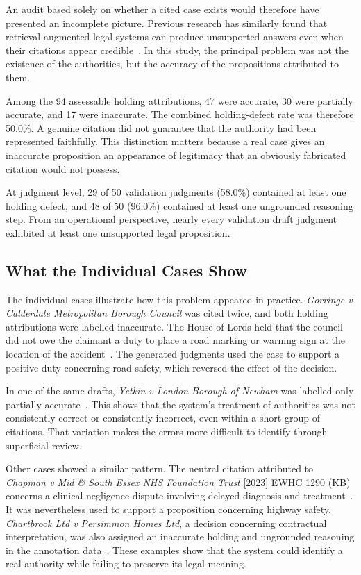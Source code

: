 \documentclass[conference]{IEEEtran}
\begin{document}
An audit based solely on whether a cited case exists would therefore have presented an incomplete picture. Previous research has similarly found that retrieval-augmented legal systems can produce unsupported answers even when their citations appear credible~\cite{magesh2024}. In this study, the principal problem was not the existence of the authorities, but the accuracy of the propositions attributed to them.

Among the 94 assessable holding attributions, 47 were accurate, 30 were partially accurate, and 17 were inaccurate. The combined holding-defect rate was therefore 50.0\%. A genuine citation did not guarantee that the authority had been represented faithfully. This distinction matters because a real case gives an inaccurate proposition an appearance of legitimacy that an obviously fabricated citation would not possess.

At judgment level, 29 of 50 validation judgments (58.0\%) contained at least one holding defect, and 48 of 50 (96.0\%) contained at least one ungrounded reasoning step. From an operational perspective, nearly every validation draft judgment exhibited at least one unsupported legal proposition.

\subsection{What the Individual Cases Show}

The individual cases illustrate how this problem appeared in practice. \textit{Gorringe v Calderdale Metropolitan Borough Council} was cited twice, and both holding attributions were labelled inaccurate. The House of Lords held that the council did not owe the claimant a duty to place a road marking or warning sign at the location of the accident~\cite{gorringe2004}. The generated judgments used the case to support a positive duty concerning road safety, which reversed the effect of the decision.

In one of the same drafts, \textit{Yetkin v London Borough of Newham} was labelled only partially accurate~\cite{yetkin2010}. This shows that the system's treatment of authorities was not consistently correct or consistently incorrect, even within a short group of citations. That variation makes the errors more difficult to identify through superficial review.

Other cases showed a similar pattern. The neutral citation attributed to \textit{Chapman v Mid \& South Essex NHS Foundation Trust} [2023] EWHC 1290 (KB) concerns a clinical-negligence dispute involving delayed diagnosis and treatment~\cite{chapman2023}. It was nevertheless used to support a proposition concerning highway safety. \textit{Chartbrook Ltd v Persimmon Homes Ltd}, a decision concerning contractual interpretation, was also assigned an inaccurate holding and ungrounded reasoning in the annotation data~\cite{chartbrook2009}. These examples show that the system could identify a real authority while failing to preserve its legal meaning.
\end{document}
